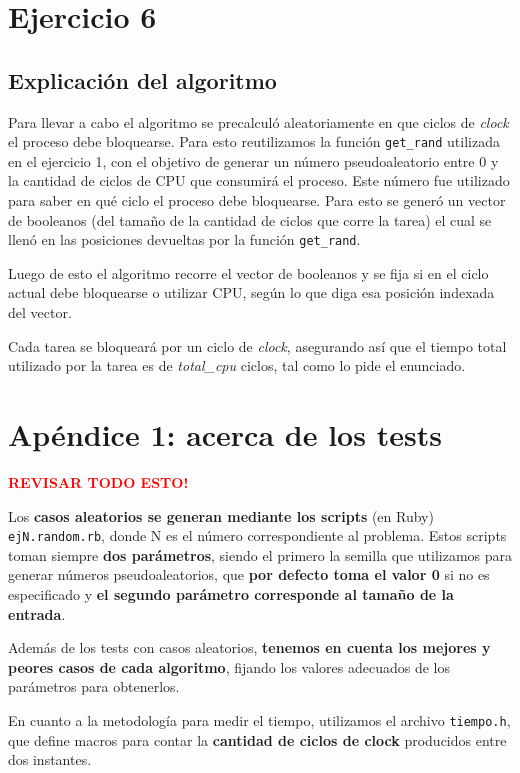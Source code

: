 \documentclass[a4paper]{article}
\begin{document}
\section{Ejercicio 6}

\subsection{Explicación del algoritmo}
Para llevar a cabo el algoritmo se precalculó aleatoriamente en que ciclos
de \textit{clock} el proceso debe bloquearse. Para esto reutilizamos la
función \verb|get_rand| utilizada en el ejercicio 1, con el objetivo de
generar un número pseudoaleatorio entre 0 y la cantidad de ciclos de CPU que
consumirá el proceso. Este número fue utilizado para saber en qué ciclo el
proceso debe bloquearse. Para esto se generó un vector de booleanos (del
tamaño de la cantidad de ciclos que corre la tarea) el cual se llenó en las
posiciones devueltas por la función \verb|get_rand|.

Luego de esto el algoritmo recorre el vector de booleanos y se fija si en
el ciclo actual debe bloquearse o utilizar CPU, según lo que diga esa
posición indexada del vector. 

Cada tarea se bloqueará por un ciclo de \textit{clock}, asegurando así que
el tiempo total utilizado por la tarea es de \textit{total\_cpu} ciclos,
tal como lo pide el enunciado.


\newpage

\section{Apéndice 1: acerca de los tests}


\textcolor{red}{\textbf{REVISAR TODO ESTO!}} \medskip

Los \textbf{casos aleatorios se generan mediante los scripts} (en Ruby) \verb|ejN.random.rb|, donde
N es el número correspondiente al problema. Estos scripts toman siempre \textbf{dos parámetros},
siendo el primero la semilla que utilizamos para generar números pseudoaleatorios, que
\textbf{por defecto toma el valor 0} si no es especificado y \textbf{el segundo parámetro corresponde
al tamaño de la entrada}.

Además de los tests con casos aleatorios, \textbf{tenemos en cuenta los mejores y peores
casos de cada algoritmo}, fijando los valores adecuados de los parámetros para
obtenerlos. \medskip

En cuanto a la metodología para medir el tiempo, utilizamos el archivo \verb|tiempo.h|,
que define macros para contar la \textbf{cantidad de ciclos de clock} producidos entre dos instantes. \medskip
\end{document}
